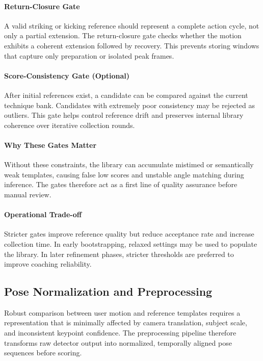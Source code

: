 \documentclass[12pt]{article}
\begin{document}
{\paragraph{Return-Closure Gate}
A valid striking or kicking reference should represent a complete action cycle, not only a partial extension. The return-closure gate checks whether the motion exhibits a coherent extension followed by recovery. This prevents storing windows that capture only preparation or isolated peak frames.

\paragraph{Score-Consistency Gate (Optional)}
After initial references exist, a candidate can be compared against the current technique bank. Candidates with extremely poor consistency may be rejected as outliers. This gate helps control reference drift and preserves internal library coherence over iterative collection rounds.

\paragraph{Why These Gates Matter}
Without these constraints, the library can accumulate mistimed or semantically weak templates, causing false low scores and unstable angle matching during inference. The gates therefore act as a first line of quality assurance before manual review.

\paragraph{Operational Trade-off}
Stricter gates improve reference quality but reduce acceptance rate and increase collection time. In early bootstrapping, relaxed settings may be used to populate the library. In later refinement phases, stricter thresholds are preferred to improve coaching reliability.

\subsection{Pose Normalization and Preprocessing}

Robust comparison between user motion and reference templates requires a representation that is minimally affected by camera translation, subject scale, and inconsistent keypoint confidence. The preprocessing pipeline therefore transforms raw detector output into normalized, temporally aligned pose sequences before scoring.

}
\end{document}
